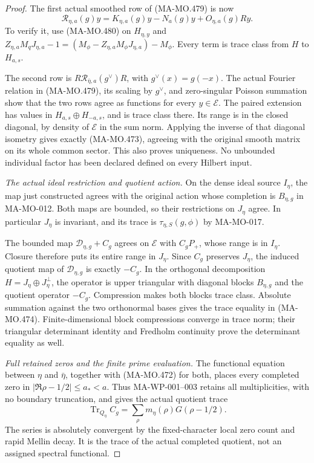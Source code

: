 \begin{proof}
The first actual smoothed row of (MA-MO.479) is now
\[
        \mathscr R_{\eta,a}(g)y
          =K_{\eta,a}(g)y-N_a(g)y+O_{\eta,a}(g)Ry.
 \tag{MA-MO.482}
\]
To verify it, use (MA-MO.480) on \(H_{\eta,y}\) and
\(Z_{\eta,a}M_qJ_{\eta,a}-1
   =(M_\phi-Z_{\eta,a}M_\phi J_{\eta,a})-M_\phi\).
Every term is trace class from \(H\) to \(H_{a,s}\).

The second row is
\(R\mathscr R_{\bar\eta,a}(g^\vee)R\), with
\(g^\vee(x)=g(-x)\). The actual Fourier relation in
(MA-MO.479), its scaling by \(g^\vee\), and zero-singular
Poisson summation show that the two rows agree as functions
for every \(y\in\mathcal E\). The paired extension has
values in \(H_{a,s}\oplus H_{-a,s}\), and is trace class
there. Its range is in the closed diagonal, by density of
\(\mathcal E\) in the sum norm. Applying the inverse of
that diagonal isometry gives exactly (MA-MO.473), agreeing
with the original smooth matrix on its whole common sector.
This also proves uniqueness. No unbounded individual
factor has been declared defined on every Hilbert input.

\emph{The actual ideal restriction and quotient action.}
On the dense ideal source \(I_\eta\), the map just
constructed agrees with the original action whose
completion is \(B_{\eta,g}\) in MA-MO-012. Both maps
are bounded, so their restrictions on \(J_\eta\) agree.
In particular \(J_\eta\) is invariant, and its trace is
\(\tau_{\eta,S}(g,\phi)\) by MA-MO-017.

The bounded map \(\mathscr D_{\eta,g}+C_g\) agrees
on \(\mathcal E\) with \(C_gP_+\), whose range is
in \(I_\eta\). Closure therefore puts its entire range
in \(J_\eta\). Since \(C_g\) preserves \(J_\eta\),
the induced quotient map of \(\mathscr D_{\eta,g}\)
is exactly \(-C_g\). In the orthogonal decomposition
\(H=J_\eta\oplus J_\eta^\perp\), the operator is
upper triangular with diagonal blocks \(B_{\eta,g}\)
and the quotient operator \(-C_g\). Compression makes
both blocks trace class. Absolute summation against the
two orthonormal bases gives the trace equality in
(MA-MO.474). Finite-dimensional block compressions converge
in trace norm; their triangular determinant identity and
Fredholm continuity prove the determinant equality as well.

\emph{Full retained zeros and the finite prime evaluation.}
The functional equation between \(\eta\) and \(\bar\eta\),
together with (MA-MO.472) for both, places every completed
zero in \(|\Re\rho-1/2|\le a_*<a\). Thus MA-WP-001--003
retains all multiplicities, with no boundary truncation,
and gives the actual quotient trace
\[
        \operatorname{Tr}_{Q_\eta}C_g
                  =\sum_\rho m_\eta(\rho)G(\rho-1/2).
 \tag{MA-MO.483}
\]
The series is absolutely convergent by the fixed-character
local zero count and rapid Mellin decay. It is the trace
of the actual completed quotient, not an assigned spectral
functional.


\end{proof}
